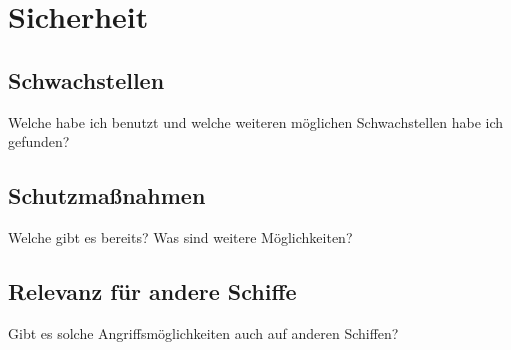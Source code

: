 \chapter{Sicherheit}

\section{Schwachstellen}
Welche habe ich benutzt und welche weiteren möglichen Schwachstellen habe ich gefunden?

\section{Schutzmaßnahmen}
Welche gibt es bereits?
Was sind weitere Möglichkeiten?

\section{Relevanz für andere Schiffe}
Gibt es solche Angriffsmöglichkeiten auch auf anderen Schiffen?
